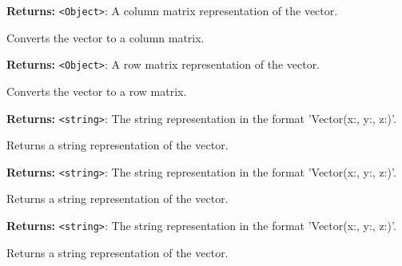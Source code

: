 \documentclass[12pt,a4paper]{article}
\begin{document}
\vspace{5mm}
\noindent {}


\noindent \textbf{Returns:} \texttt{<Object>}: A column matrix representation of the vector.

\noindent Converts the vector to a column matrix.

\vspace{5mm}
\noindent {}


\noindent \textbf{Returns:} \texttt{<Object>}: A row matrix representation of the vector.

\noindent Converts the vector to a row matrix.

\vspace{5mm}
\noindent {}


\noindent \textbf{Returns:} \texttt{<string>}: The string representation in the format 'Vector(x:, y:, z:)'.

\noindent Returns a string representation of the vector.

\vspace{5mm}
\noindent {}


\noindent \textbf{Returns:} \texttt{<string>}: The string representation in the format 'Vector(x:, y:, z:)'.

\noindent Returns a string representation of the vector.

\vspace{5mm}
\noindent {}


\noindent \textbf{Returns:} \texttt{<string>}: The string representation in the format 'Vector(x:, y:, z:)'.

\noindent Returns a string representation of the vector.

\vspace{5mm}
\noindent {}
\end{document}
